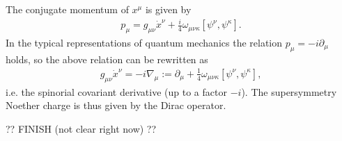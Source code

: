     The conjugate momentum of $x^\mu$ is given by
    \begin{gather}
        p_\mu = g_{\mu\nu}\dot{x}^\nu + \frac{i}{4}\omega_{\mu\nu\kappa}[\psi^\nu,\psi^\kappa].
    \end{gather}
    In the typical representations of quantum mechanics the relation $p_\mu = -i\partial_\mu$ holds, so the above relation can be rewritten as
    \begin{gather}
        g_{\mu\nu}\dot{x}^\nu = -i\nabla_\mu := \partial_\mu + \frac{1}{4}\omega_{\mu\nu\kappa}[\psi^\nu,\psi^\kappa],
    \end{gather}
    i.e. the spinorial covariant derivative (up to a factor $-i$). The supersymmetry Noether charge is thus given by the Dirac operator.

    ?? FINISH (not clear right now)  ??